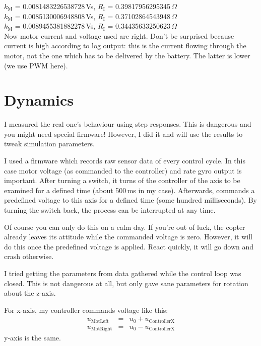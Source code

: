 \documentclass[a4paper, 11pt, pdftex]{article}
\newcommand{\vi}[1]{_{\textrm{#1}}}
\begin{document}
    $k\vi{M}$ = 0.0081483226538728\,Vs, $R\vi{I}$ = 0.39817956295345\,$\Omega$ \\
    $k\vi{M}$ = 0.0085130006948808\,Vs, $R\vi{I}$ = 0.37102864543948\,$\Omega$ \\    
    $k\vi{M}$ = 0.0089455381882278\,Vs, $R\vi{I}$ = 0.34435633250623\,$\Omega$ \\
    
    Now motor current and voltage used are right. Don't be surprised because current 
    is high according to log output: this is the current flowing through the motor, 
    not the one which has to be delivered by the battery. The latter is lower 
    (we use PWM here).

  \section{Dynamics}
  
    I measured the real one's behaviour using step responses. This is
    dangerous and you might need special firmware! However, I did it and
    will use the results to tweak simulation parameters.

    I used a firmware which records raw sensor data of every control cycle.
    In this case motor voltage (as commanded to the controller) and rate
    gyro output is important. After turning a switch, it turns of the
    controller of the axis to be examined for a defined time (about 500\,ms in
    my case). Afterwards, commands a predefined voltage to this axis for a
    defined time (some hundred milliseconds). By turning the switch back,
    the process can be interrupted at any time.

    Of course you can only do this on a calm day. If you're out of luck, the
    copter already leaves its attitude while the commanded voltage is zero.
    However, it will do this once the predefined voltage is applied. React
    quickly, it will go down and crash otherwise.

    I tried getting the parameters from data gathered while the control loop
    was closed. This is not dangerous at all, but only gave sane parameters
    for rotation about the z-axis.

    For x-axis, my controller commands voltage like this:
    \begin{subequations}  \label{f:U}
    \begin{eqnarray}
      u\vi{MotLeft}  &=& u_0 + u\vi{ControllerX}\\
      u\vi{MotRight} &=& u_0 - u\vi{ControllerX}
    \end{eqnarray}
    \end{subequations}
    y-axis is the same.
\end{document}
